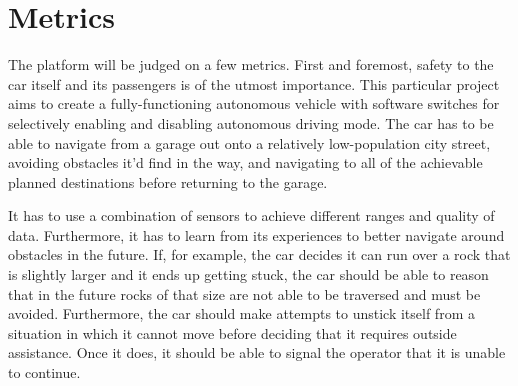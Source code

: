 \documentclass[journal,draftclsnofoot,onecolumn]{IEEEtran}
\begin{document}
\section{Metrics}

The platform will be judged on a few metrics. First and foremost, safety to the car itself and its passengers is of the utmost importance. This particular project aims to create a fully-functioning autonomous vehicle with software switches for selectively enabling and disabling autonomous driving mode. The car has to be able to navigate from a garage out onto a relatively low-population city street, avoiding obstacles it’d find in the way, and navigating to all of the achievable planned destinations before returning to the garage. 

It has to use a combination of sensors to achieve different ranges and quality of data. Furthermore, it has to learn from its experiences to better navigate around obstacles in the future. If, for example, the car decides it can run over a rock that is slightly larger and it ends up getting stuck, the car should be able to reason that in the future rocks of that size are not able to be traversed and must be avoided. Furthermore, the car should make attempts to unstick itself from a situation in which it cannot move before deciding that it requires outside assistance. Once it does, it should be able to signal the operator that it is unable to continue. 




\end{document}

